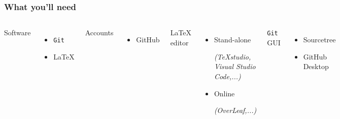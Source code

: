 \documentclass{beamer}
\begin{document}
\begin{frame}
    \frametitle{What you'll need}

\begin{columns}


Software
    \begin{itemize}
        \item \texttt{Git}
        \item \LaTeX
    \end{itemize}
Accounts
    \begin{itemize}
        \item GitHub\footnotemark
    \end{itemize}

\LaTeX{} editor
    \begin{itemize}
        \item Stand-alone {\tiny \emph{(TeXstudio, Visual Studio Code,...)} \par}
        \item Online {\tiny \emph{(OverLeaf,...)} \par}
    \end{itemize}
\texttt{Git} GUI 
    \begin{itemize}
        \item Sourcetree
        \item GitHub Desktop
    \end{itemize}

   \begin{figure}
    \centering
    \includegraphics[width = 0.9\textwidth]{figs/phd101212s.png}
  \end{figure}
\end{columns}
\end{frame}
\end{document}
